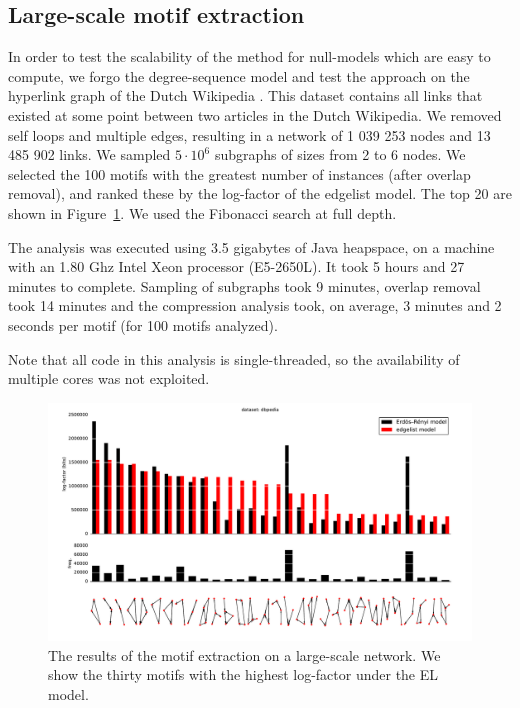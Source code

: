 \subsection{Large-scale motif extraction}
\label{section:large}
In order to test the scalability of the method for null-models which are easy to compute, we forgo the degree-sequence model and test the approach on the hyperlink graph of the Dutch Wikipedia \cite{konect:2015:link-dynamic-nlwiki,konect:unlink}. This dataset contains all links that existed at some point between two articles in the Dutch Wikipedia. We removed self loops and multiple edges, resulting in a network of 1 039 253 nodes and 13 485 902 links.  We sampled $5 \cdot 10^6$ subgraphs of sizes from 2 to 6 nodes. We selected the 100 motifs with the greatest number of instances (after overlap removal), and ranked these by the log-factor of the edgelist model. The top 20 are shown in Figure~\ref{figure:plot-large}. We used the Fibonacci search at full depth.

The analysis was executed using 3.5 gigabytes of Java heapspace, on a machine with an 1.80 Ghz Intel Xeon processor (E5-2650L). It took 5 hours and 27 minutes to complete. Sampling of subgraphs took 9 minutes, overlap removal took 14 minutes and the compression analysis took, on average, 3 minutes and 2 seconds per motif (for 100 motifs analyzed).

Note that all code in this analysis is single-threaded, so the availability of multiple cores was not exploited.

\begin{figure}[htb]
  \hspace{-4cm}
  \includegraphics[width=20cm]{./images/large/compare-plot.pdf}
  \caption{The results of the motif extraction on a large-scale network. We show the thirty motifs with the highest log-factor under the EL model.}
  \label{figure:plot-large}
\end{figure}

